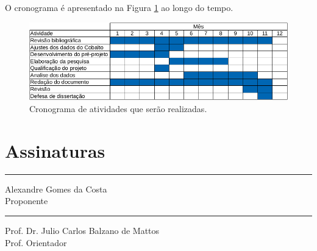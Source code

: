 \documentclass[diss-proposta,nocipinfo]{texufpel}
\begin{document}
O cronograma é apresentado na Figura \ref{fig:cronograma} ao longo do tempo.
\begin{figure}[htbp]
  \centering \includegraphics[scale=.4]{imagens/cronograma.png}
  \caption{Cronograma de atividades que serão realizadas.}
  \label{fig:cronograma}
\end{figure}





\chapter{Assinaturas}
\vspace{2cm}

\begin{center}
\rule{8cm}{.3mm}
\medskip

	Alexandre Gomes da Costa\\
	Proponente

\end{center}

\vspace{4cm}

\begin{center}
\rule{8cm}{.3mm}
\medskip

	Prof. Dr. Julio Carlos Balzano de Mattos\\
	Prof. Orientador

\end{center}
\end{document}
